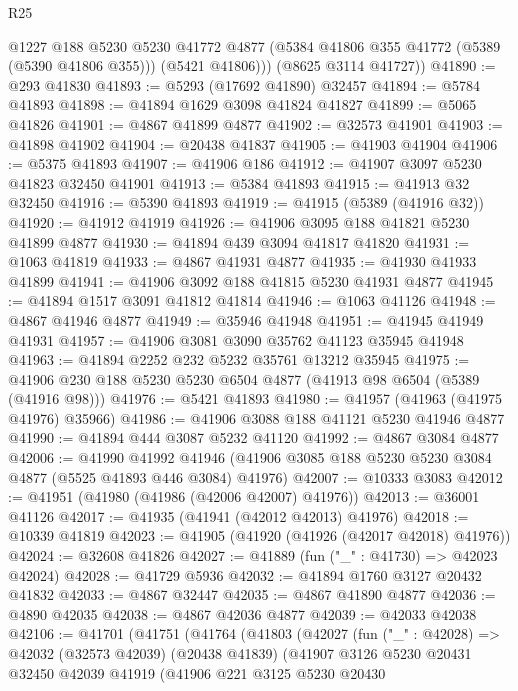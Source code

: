 \begin{lexlean}{R25}
\begin{coremodule}
          @1227
          @188
          @5230
          @5230
          @41772
          @4877
          (@5384 @41806 @355 @41772 (@5389 (@5390 @41806 @355)))
          (@5421 @41806)))
      (@8625 @3114 @41727))
@41890 := @293 @41830
@41893 := @5293 (@17692 @41890) @32457
@41894 := @5784 @41893
@41898 := @41894 @1629 @3098 @41824 @41827
@41899 := @5065 @41826
@41901 := @4867 @41899 @4877
@41902 := @32573 @41901
@41903 := @41898 @41902
@41904 := @20438 @41837
@41905 := @41903 @41904
@41906 := @5375 @41893
@41907 := @41906 @186
@41912 := @41907 @3097 @5230 @41823 @32450 @41901
@41913 := @5384 @41893
@41915 := @41913 @32 @32450
@41916 := @5390 @41893
@41919 := @41915 (@5389 (@41916 @32))
@41920 := @41912 @41919
@41926 := @41906 @3095 @188 @41821 @5230 @41899 @4877
@41930 := @41894 @439 @3094 @41817 @41820
@41931 := @1063 @41819
@41933 := @4867 @41931 @4877
@41935 := @41930 @41933 @41899
@41941 := @41906 @3092 @188 @41815 @5230 @41931 @4877
@41945 := @41894 @1517 @3091 @41812 @41814
@41946 := @1063 @41126
@41948 := @4867 @41946 @4877
@41949 := @35946 @41948
@41951 := @41945 @41949 @41931
@41957 := @41906 @3081 @3090 @35762 @41123 @35945 @41948
@41963 := @41894 @2252 @232 @5232 @35761 @13212 @35945
@41975 := @41906 @230 @188 @5230 @5230 @6504 @4877 (@41913 @98 @6504 (@5389 (@41916 @98)))
@41976 := @5421 @41893
@41980 := @41957 (@41963 (@41975 @41976) @35966)
@41986 := @41906 @3088 @188 @41121 @5230 @41946 @4877
@41990 := @41894 @444 @3087 @5232 @41120
@41992 := @4867 @3084 @4877
@42006 := @41990
    @41992
    @41946
    (@41906 @3085 @188 @5230 @5230 @3084 @4877 (@5525 @41893 @446 @3084) @41976)
@42007 := @10333 @3083
@42012 := @41951 (@41980 (@41986 (@42006 @42007) @41976))
@42013 := @36001 @41126
@42017 := @41935 (@41941 (@42012 @42013) @41976)
@42018 := @10339 @41819
@42023 := @41905 (@41920 (@41926 (@42017 @42018) @41976))
@42024 := @32608 @41826
@42027 := @41889 (fun ("_" : @41730) => @42023 @42024)
@42028 := @41729 @5936
@42032 := @41894 @1760 @3127 @20432 @41832
@42033 := @4867 @32447
@42035 := @4867 @41890 @4877
@42036 := @4890 @42035
@42038 := @4867 @42036 @4877
@42039 := @42033 @42038
@42106 := @41701
    (@41751
      (@41764
        (@41803
          (@42027
            (fun ("_" : @42028) =>
            @42032
              (@32573 @42039)
              (@20438 @41839)
              (@41907
                @3126
                @5230
                @20431
                @32450
                @42039
                @41919
                (@41906
                  @221
                  @3125
                  @5230
                  @20430

\end{coremodule}
\end{lexlean}
